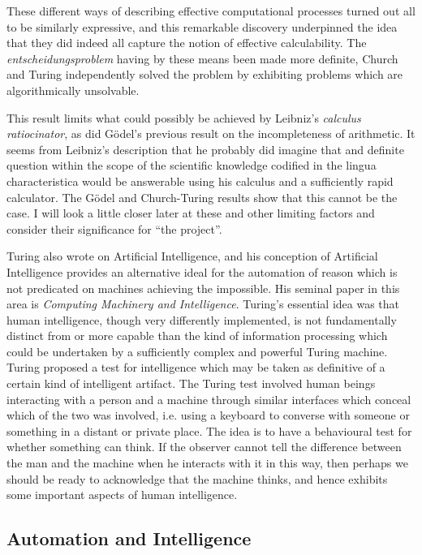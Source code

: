 These different ways of describing effective computational processes turned out all to be similarly expressive, and this remarkable discovery underpinned the idea that they did indeed all capture the notion of effective calculability.
The \emph{entscheidungsproblem} having by these means been made more definite, Church and Turing independently solved the problem by exhibiting problems which are algorithmically unsolvable.

This result limits what could possibly be achieved by Leibniz's \emph{calculus ratiocinator}, as did G\"odel's previous result on the incompleteness of arithmetic.
It seems from Leibniz's description that he probably did imagine that and definite question within the scope of the scientific knowledge codified in the lingua characteristica would be answerable using his calculus and a sufficiently rapid calculator.
The G\"odel and Church-Turing results show that this cannot be the case.
I will look a little closer later at these and other limiting factors and consider their significance for ``the project''.


Turing also wrote on Artificial Intelligence, and his conception of Artificial Intelligence provides an alternative ideal for the automation of reason which is not predicated on machines achieving the impossible.
His seminal paper in this area is \emph{Computing Machinery and Intelligence}\cite{turingCMI}.
Turing's essential idea was that human intelligence, though very differently implemented, is not fundamentally distinct from or more capable than the kind of information processing which could be undertaken by a sufficiently complex and powerful Turing machine.
Turing proposed a test for intelligence which may be taken as definitive of a certain kind of intelligent artifact.
The Turing test involved human beings interacting with a person and a machine through similar interfaces which conceal which of the two was involved, i.e. using a keyboard to converse with someone or something in a distant or private place.
The idea is to have a behavioural test for whether something can think.
If the observer cannot tell the difference between the man and the machine when he interacts with it in this way, then perhaps we should be ready to acknowledge that the machine thinks, and hence exhibits some important aspects of human intelligence.


\subsection{Automation and Intelligence}\label{AutomationAndIntelligence}

